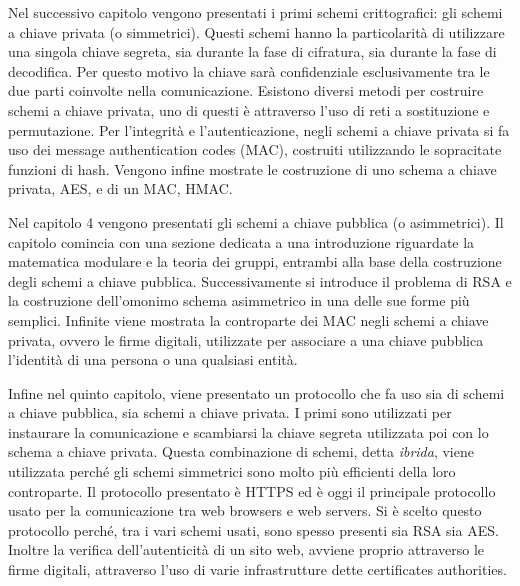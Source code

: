 \par
Nel successivo capitolo vengono presentati i primi schemi crittografici: gli schemi a chiave privata (o simmetrici). Questi schemi hanno la particolarità di utilizzare una singola chiave segreta, sia durante la fase di cifratura, sia durante la fase di decodifica. Per questo motivo la chiave sarà confidenziale esclusivamente tra le due parti coinvolte nella comunicazione. Esistono diversi metodi per costruire schemi a chiave privata, uno di questi è attraverso l'uso di reti a sostituzione e permutazione. Per l'integrità e l'autenticazione, negli schemi a chiave privata si fa uso dei message authentication codes (MAC), costruiti utilizzando le sopracitate funzioni di hash. Vengono infine mostrate le costruzione di uno schema a chiave privata, AES, e di un MAC, HMAC.
\par
Nel capitolo 4 vengono presentati gli schemi a chiave pubblica (o asimmetrici). Il capitolo comincia con una sezione dedicata a una introduzione riguardate la matematica modulare e la teoria dei gruppi, entrambi alla base della costruzione degli schemi a chiave pubblica. Successivamente si introduce il problema di RSA e la costruzione dell'omonimo schema asimmetrico in una delle sue forme più semplici. Infinite viene mostrata la controparte dei MAC negli schemi a chiave privata, ovvero le firme digitali, utilizzate per associare a una chiave pubblica l'identità di una persona o una qualsiasi entità.
\par
Infine nel quinto capitolo, viene presentato un protocollo che fa uso sia di schemi a chiave pubblica, sia schemi a chiave privata. I primi sono utilizzati per instaurare la comunicazione e scambiarsi la chiave segreta utilizzata poi con lo schema a chiave privata. Questa combinazione di schemi, detta \emph{ibrida}, viene utilizzata perché gli schemi simmetrici sono molto più efficienti della loro controparte. Il protocollo presentato è HTTPS ed è oggi il principale protocollo usato per la comunicazione tra web browsers e web servers. Si è scelto questo protocollo perché, tra i vari schemi usati, sono spesso presenti sia RSA sia AES. Inoltre la verifica dell'autenticità di un sito web, avviene proprio attraverso le firme digitali, attraverso l'uso di varie infrastrutture dette certificates authorities.
